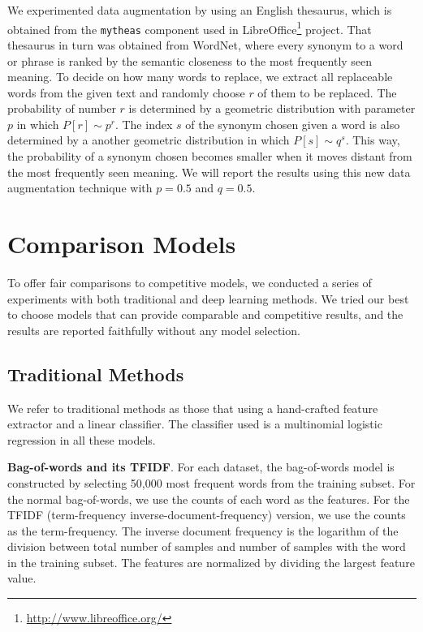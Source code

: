 \documentclass{article} %
\begin{document}
We experimented data augmentation by using an English thesaurus, which is obtained from the \texttt{mytheas} component used in LibreOffice\footnote{\url{http://www.libreoffice.org/}} project. That thesaurus in turn was obtained from WordNet\cite{F05}, where every synonym to a word or phrase is ranked by the semantic closeness to the most frequently seen meaning. To decide on how many words to replace, we extract all replaceable words from the given text and randomly choose \(r\) of them to be replaced. The probability of number \(r\) is determined by a geometric distribution with parameter \(p\) in which \(P[r] \sim p^r\). The index \(s\) of the synonym chosen given a word is also determined by a another geometric distribution in which \(P[s] \sim q^s\). This way, the probability of a synonym chosen becomes smaller when it moves distant from the most frequently seen meaning. We will report the results using this new data augmentation technique with \(p = 0.5\) and \(q = 0.5\).

\section{Comparison Models}

To offer fair comparisons to competitive models, we conducted a series of experiments with both traditional and deep learning methods. We tried our best to choose models that can provide comparable and competitive results, and the results are reported faithfully without any model selection.

\subsection{Traditional Methods}

We refer to traditional methods as those that using a hand-crafted feature extractor and a linear classifier. The classifier used is a multinomial logistic regression in all these models.

\textbf{Bag-of-words and its TFIDF}. For each dataset, the bag-of-words model is constructed by selecting 50,000 most frequent words from the training subset. For the normal bag-of-words, we use the counts of each word as the features. For the TFIDF (term-frequency inverse-document-frequency)\cite{J72} version, we use the counts as the term-frequency. The inverse document frequency is the logarithm of the division between total number of samples and number of samples with the word in the training subset. The features are normalized by dividing the largest feature value.
\end{document}
